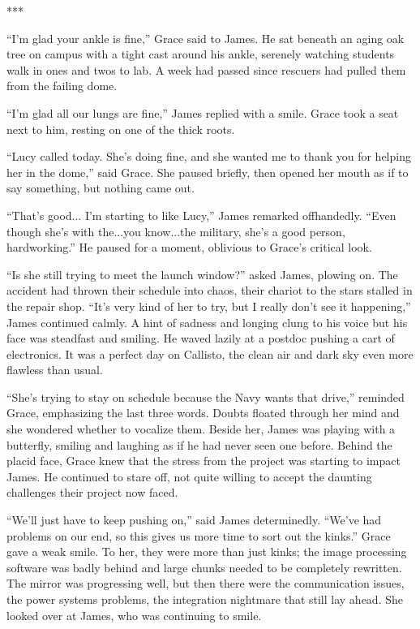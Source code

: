 \documentclass[12pt]{article} %
\begin{document}
\begin{center}
***
\end{center}

``I'm glad your ankle is fine,'' Grace said to James. He sat beneath an aging oak tree on campus with a tight cast around his ankle, serenely watching students walk in ones and twos to lab. A week had passed since rescuers had pulled them from the failing dome.

``I'm glad all our lungs are fine,'' James replied with a smile. Grace took a seat next to him, resting on one of the thick roots.

``Lucy called today. She's doing fine, and she wanted me to thank you for helping her in the dome,'' said Grace. She paused briefly, then opened her mouth as if to say something, but nothing came out.

``That's good... I'm starting to like Lucy,'' James remarked offhandedly. ``Even though she's with the...you know...the military, she's a good person, hardworking.'' He paused for a moment, oblivious to Grace's critical look. 

``Is she still trying to meet the launch window?'' asked James, plowing on. The accident had thrown their schedule into chaos, their chariot to the stars stalled in the repair shop. ``It's very kind of her to try, but I really don't see it happening,'' James continued calmly. A hint of sadness and longing clung to his voice but his face was steadfast and smiling. He waved lazily at a postdoc pushing a cart of electronics. It was a perfect day on Callisto, the clean air and dark sky even more flawless than usual.

``She's trying to stay on schedule because the Navy wants that drive,'' reminded Grace, emphasizing the last three words. Doubts floated through her mind and she wondered whether to vocalize them. Beside her, James was playing with a butterfly, smiling and laughing as if he had never seen one before. Behind the placid face, Grace knew that the stress from the project was starting to impact James. He continued to stare off, not quite willing to accept the daunting challenges their project now faced.

``We'll just have to keep pushing on,'' said James determinedly. ``We've had problems on our end, so this gives us more time to sort out the kinks.'' Grace gave a weak smile. To her, they were more than just kinks; the image processing software was badly behind and large chunks needed to be completely rewritten. The mirror was progressing well, but then there were the communication issues, the power systems problems, the integration nightmare that still lay ahead. She looked over at James, who was continuing to smile. 
\end{document}
